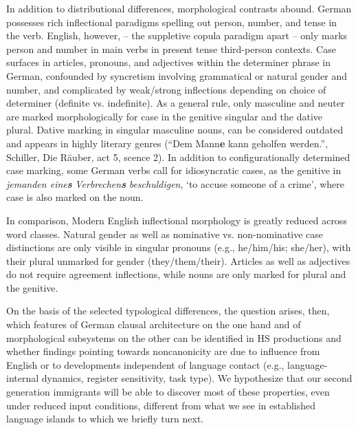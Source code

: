 \documentclass[output=paper]{langscibook}
\begin{document}
\begin{exe}%
\end{exe}

In addition to distributional differences, morphological contrasts abound. German possesses rich inflectional paradigms spelling out person, number, and tense in the verb. English, however, – the suppletive copula paradigm apart – only marks person and number in main verbs in present tense third-person contexts. Case surfaces in articles, pronouns, and adjectives within the determiner phrase in German, confounded by syncretism involving grammatical or natural gender and number, and complicated by weak/strong inflections depending on choice of determiner (definite vs. indefinite). As a general rule, only masculine and neuter are marked morphologically for case in the genitive singular and the dative plural. Dative marking in singular masculine nouns, can be considered outdated and appears in highly literary genres (“Dem Mann\textbf{e} kann geholfen werden.”, Schiller, Die Räuber, act 5, scence 2). In addition to configurationally determined case marking, some German verbs call for idiosyncratic cases, as the genitive in \textit{jemanden eine}\textbf{\textit{s} }\textit{Verbrechen}\textbf{\textit{s} }\textit{beschuldigen}, ‘to accuse someone of a crime’, where case is also marked on the noun.

In comparison, Modern English inflectional morphology is greatly reduced across word classes. Natural gender as well as nominative vs. non-nominative case distinctions are only visible in singular pronouns (e.g., he/him/his; she/her), with their plural unmarked for gender (they/them/their). Articles as well as adjectives do not require agreement inflections, while nouns are only marked for plural and the genitive. 

On the basis of the selected typological differences, the question arises, then, which features of German clausal architecture on the one hand and of morphological subsystems on the other can be identified in HS productions and whether findings pointing towards noncanonicity are due to influence from English or to developments independent of language contact (e.g., language-internal dynamics, register sensitivity, task type). We hypothesize that our second generation immigrants will be able to discover most of these properties, even under reduced input conditions, different from what we see in established language islands to which we briefly turn next.
\end{document}
